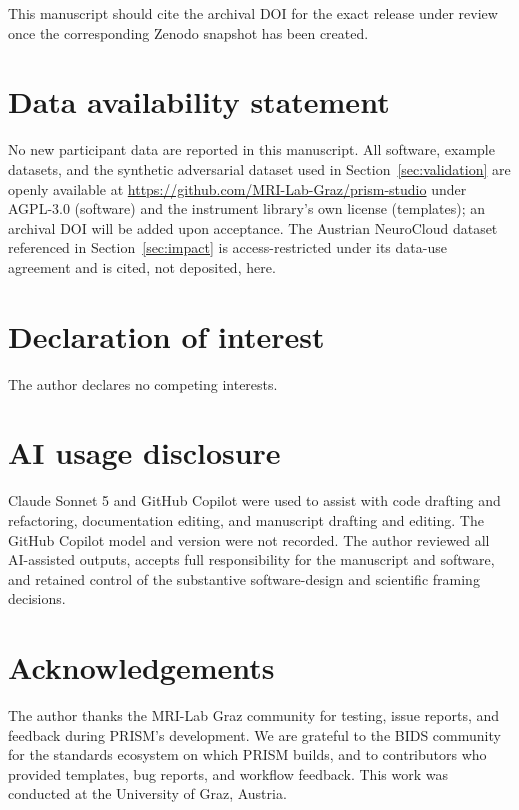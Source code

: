\documentclass[10pt]{article}
\begin{document}
This manuscript should cite the archival DOI for the exact release under
review once the corresponding Zenodo snapshot has been created.

\section{Data availability statement}

No new participant data are reported in this manuscript. All software,
example datasets, and the synthetic adversarial dataset used in
Section~\ref{sec:validation} are openly available at
\url{https://github.com/MRI-Lab-Graz/prism-studio} under AGPL-3.0 (software)
and the instrument library's own license (templates); an archival DOI will
be added upon acceptance. The Austrian NeuroCloud dataset referenced in
Section~\ref{sec:impact} is access-restricted under its data-use agreement
and is cited, not deposited, here.

\section{Declaration of interest}

The author declares no competing interests.

\section{AI usage disclosure}

Claude Sonnet 5 and GitHub Copilot were used to assist with code drafting
and refactoring, documentation editing, and manuscript drafting and editing.
The GitHub Copilot model and version were not recorded. The author reviewed
all AI-assisted outputs, accepts full responsibility for the manuscript and
software, and retained control of the substantive software-design and
scientific framing decisions.

\section*{Acknowledgements}

The author thanks the MRI-Lab Graz community for testing, issue reports,
and feedback during PRISM's development. We are grateful to the BIDS
community for the standards ecosystem on which PRISM builds, and to
contributors who provided templates, bug reports, and workflow feedback.
This work was conducted at the University of Graz, Austria.



\end{document}
